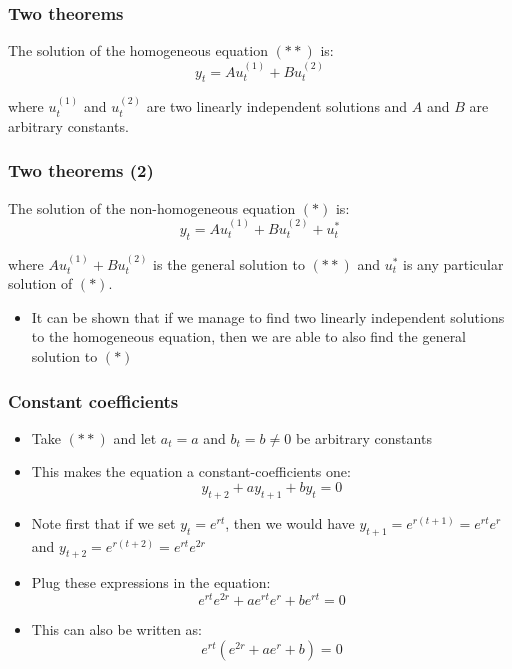 \documentclass[10pt,usenames,dvipsnames]{beamer}
\theoremstyle{definition}
\begin{document}
\begin{frame}[fragile]
\frametitle{Two theorems}
\begin{theorem}
	The solution of the homogeneous equation $(**)$ is:
	\[
		y_{t} = Au_{t}^{(1)} + Bu_{t}^{(2)}
	\]
	
	where $u_{t}^{(1)}$ and $u_{t}^{(2)}$ are two linearly independent solutions and $A$ and $B$ are arbitrary constants.
\end{theorem}
\end{frame}

\begin{frame}[fragile]
\frametitle{Two theorems (2)}
\begin{theorem}
	The solution of the non-homogeneous equation $(*)$ is:
	\[
		y_{t} = Au_{t}^{(1)} + Bu_{t}^{(2)} + u_{t}^{*}
	\]
	
	where $Au_{t}^{(1)} + Bu_{t}^{(2)}$ is the general solution to $(**)$ and $u_{t}^{*}$ is any particular solution of $(*)$.
\end{theorem}

\begin{itemize}
	\item It can be shown that if we manage to find two linearly independent solutions to the homogeneous equation, then we are able to also find the general solution to $(*)$
\end{itemize}
\end{frame}

\begin{frame}[fragile]
\frametitle{Constant coefficients}
\begin{itemize}
	\item Take $(**)$ and let $a_{t} = a$ and $b_{t} = b \neq 0$ be arbitrary constants
	\item This makes the equation a constant-coefficients one:
	\[
		y_{t+2} + ay_{t+1} + by_{t} = 0
	\]
	\item Note first that if we set $y_{t} = e^{rt}$, then we would have $y_{t+1} = e^{r(t+1)} = e^{rt}e^{r}$ and $y_{t+2} = e^{r(t+2)} = e^{rt}e^{2r}$
	\item Plug these expressions in the equation:
	\[
		e^{rt}e^{2r} + ae^{rt}e^{r} + be^{rt} = 0
	\]
	\item This can also be written as:
	\[
		e^{rt}(e^{2r} + ae^{r} + b) = 0
	\] 
\end{itemize}
\end{frame}
\end{document}
